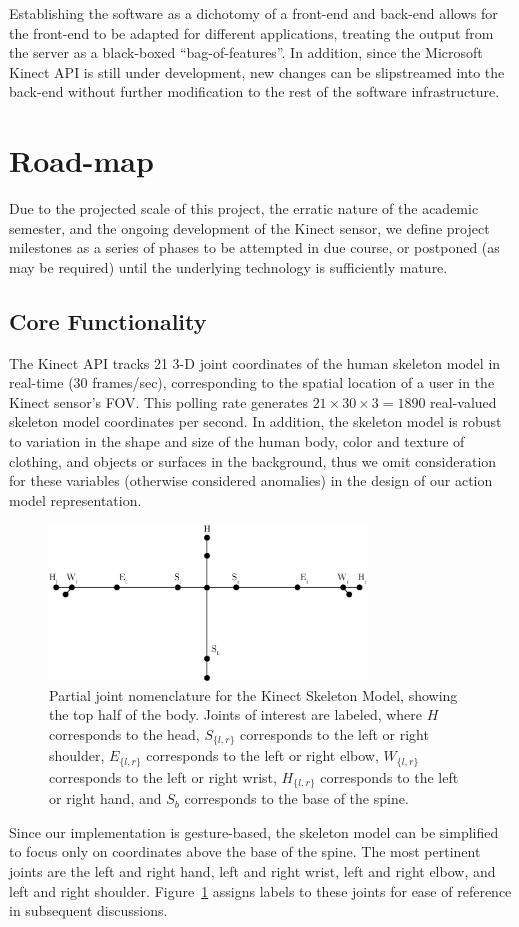 \documentclass{scrartcl}
\numberwithin{equation}{section}
\begin{document}
    Establishing the software as a dichotomy of a front-end and back-end allows for the front-end to be adapted for different applications, treating the output from the server as a black-boxed ``bag-of-features''. In addition, since the Microsoft Kinect API is still under development, new changes can be slipstreamed into the back-end without further modification to the rest of the software infrastructure.
  \section{Road-map}
    \renewcommand{\thesubsection}{\Roman{subsection}}
    Due to the projected scale of this project, the erratic nature of the academic semester, and the ongoing development of the Kinect sensor, we define project milestones as a series of phases to be attempted in due course, or postponed (as may be required) until the underlying technology is sufficiently mature.
    \subsection{Core Functionality\label{sec:phase1}}
      The Kinect API tracks 21 3-D joint coordinates of the human skeleton model in real-time (30 frames/sec), corresponding to the spatial location of a user in the Kinect sensor's FOV. This polling rate generates $21 \times 30 \times 3 = 1890$ real-valued skeleton model coordinates per second. In addition, the skeleton model is robust to variation in the shape and size of the human body, color and texture of clothing, and objects or surfaces in the background, thus we omit consideration for these variables (otherwise considered anomalies) in the design of our action model representation.

      \begin{figure}[ht!]
        \centering
        \includegraphics[width=0.75\textwidth]{img/Body}
        \caption{Partial joint nomenclature for the Kinect Skeleton Model, showing the top half of the body. Joints of interest are labeled, where $H$ corresponds to the head, $S_{\{ l,r \}}$ corresponds to the left or right shoulder, $E_{\{ l,r \}}$ corresponds to the left or right elbow, $W_{\{ l,r \}}$ corresponds to the left or right wrist, $H_{\{ l,r \}}$ corresponds to the left or right hand, and $S_b$ corresponds to the base of the spine.\label{fig:jointnomenclature}}
      \end{figure}
      Since our implementation is gesture-based, the skeleton model can be simplified to focus only on coordinates above the base of the spine. The most pertinent joints are the left and right hand, left and right wrist, left and right elbow, and left and right shoulder. Figure~\ref{fig:jointnomenclature} assigns labels to these joints for ease of reference in subsequent discussions.
\end{document}
